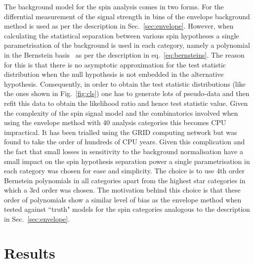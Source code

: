 The background model for the spin analysis comes in two forms. For the differntial measurement of the signal strength in bins of \abscostheta the envelope background method is used as per the description in Sec.~\ref{sec:envelope}. However, when calculating the statistical separation between various spin hypotheses a single parametrisation of the background is used in each category, namely a polynomial in the Bernstein basis~\cite{bernsteins1,bernsteins2} as per the description in eq.~\ref{eq:bernsteins}. The reason for this is that there is no asymptotic approximation for the test statistic distribution when the null hypothesis is not embedded in the alternative hypothesis. Consequently, in order to obtain the test statistic distributions (like the ones shown in Fig.~\ref{fig:cls}) one has to generate lots of pseudo-data and then refit this data to obtain the likelihood ratio and hence test statistic value. Given the complexity of the spin signal model and the combinatorics involved when using the envelope method with 40 analysis categories this becomes CPU impractical. It has been trialled using the GRID computing network but was found to take the order of hundreds of CPU years.
Given this complication and the fact that small losses in sensitivity to the background normalisation have a small impact on the spin hypothesis separation power a single parametrisation in each category was chosen for ease and simplicity. The choice is to use 4th order Bernstein polynomials in all categories apart from the highest \abscostheta star categories in which a 3rd order was chosen. The motivation behind this choice is that these order of polynomials show a similar level of bias as the envelope method when tested against ``truth" models for the spin categories analogous to the description in Sec.~\ref{sec:envelope}.

\section{Results}
\label{sec:spin_results}

